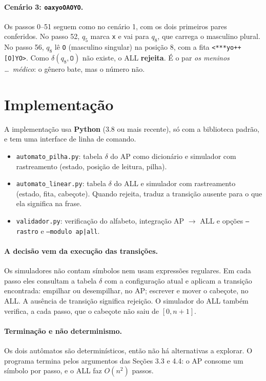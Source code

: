 \documentclass[11pt,a4paper]{article}
\newcommand{\cad}[1]{\texttt{#1}}       %
\begin{document}
\paragraph{Cenário 3: \cad{oaxyoOAOYO}.} Os passos 0--51 seguem como no cenário 1, com os dois primeiros pares conferidos. No passo 52, $q_5$ marca \cad{x} e vai para $q_8$, que carrega o masculino plural. No passo 56, $q_8$ lê \cad{O} (masculino singular) na posição 8, com a fita \cad{<***yo++[O]YO>}. Como $\delta(q_8,\cad{O})$ não existe, o ALL \textbf{rejeita}. É o par \emph{os meninos \ldots\ médico}: o gênero bate, mas o número não.

\section{Implementação}

A implementação usa \textbf{Python} (3.8 ou mais recente), só com a biblioteca padrão, e tem uma interface de linha de comando.

\begin{itemize}
  \item \texttt{automato\_pilha.py}: tabela $\delta$ do AP como dicionário e simulador com rastreamento (estado, posição de leitura, pilha).
  \item \texttt{automato\_linear.py}: tabela $\delta$ do ALL e simulador com rastreamento (estado, fita, cabeçote). Quando rejeita, traduz a transição ausente para o que ela significa na frase.
  \item \texttt{validador.py}: verificação do alfabeto, integração AP $\to$ ALL e opções \texttt{--rastro} e \texttt{--modulo ap|all}.
\end{itemize}

\paragraph{A decisão vem da execução das transições.} Os simuladores não contam símbolos nem usam expressões regulares. Em cada passo eles consultam a tabela $\delta$ com a configuração atual e aplicam a transição encontrada: empilhar ou desempilhar, no AP; escrever e mover o cabeçote, no ALL. A ausência de transição significa rejeição. O simulador do ALL também verifica, a cada passo, que o cabeçote não saiu de $[0,n+1]$.

\paragraph{Terminação e não determinismo.} Os dois autômatos são determinísticos, então não há alternativas a explorar. O programa termina pelos argumentos das Seções 3.3 e 4.4: o AP consome um símbolo por passo, e o ALL faz $O(n^2)$ passos.
\end{document}
